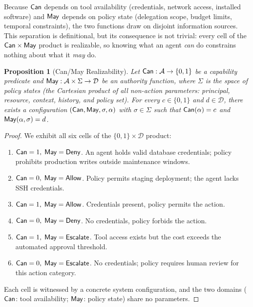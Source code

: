 \documentclass[11pt,a4paper]{article}
\newtheorem{proposition}[definition]{Proposition}
\newcommand{\termlabel}[1]{\ifmmode\mathsf{#1}\else{\normalfont\textsc{\MakeLowercase{#1}}}\fi}
\newcommand{\May}{\termlabel{May}}
\newcommand{\Can}{\termlabel{Can}}
\newcommand{\Allow}{\termlabel{Allow}}
\newcommand{\Deny}{\termlabel{Deny}}
\newcommand{\Escalate}{\termlabel{Escalate}}
\begin{document}
Because $\Can$ depends on tool availability (credentials, network access, installed software) and $\May$ depends on policy state (delegation scope, budget limits, temporal constraints), the two functions draw on disjoint information sources.  This separation is definitional, but its consequence is not trivial: every cell of the $\Can \times \May$ product is realizable, so knowing what an agent \emph{can} do constrains nothing about what it \emph{may} do.

\begin{proposition}[Can/May Realizability]
\label{thm:canmay}
Let $\Can: \mathcal{A} \to \{0, 1\}$ be a capability predicate and $\May: \mathcal{A} \times \Sigma \to \mathcal{D}$ be an authority function, where $\Sigma$ is the space of policy states (the Cartesian product of all non-action parameters: principal, resource, context, history, and policy set). For every $c \in \{0,1\}$ and $d \in \mathcal{D}$, there exists a configuration $(\Can, \May, \sigma, \alpha)$ with $\sigma \in \Sigma$ such that $\Can(\alpha) = c$ and $\May(\alpha, \sigma) = d$.
\end{proposition}

\begin{proof}
We exhibit all six cells of the $\{0,1\} \times \mathcal{D}$ product:

\begin{enumerate}[label=(\roman*), leftmargin=2em, itemsep=1pt]
  \item $\Can = 1,\; \May = \Deny$. An agent holds valid database credentials; policy prohibits production writes outside maintenance windows.
  \item $\Can = 0,\; \May = \Allow$. Policy permits staging deployment; the agent lacks SSH credentials.
  \item $\Can = 1,\; \May = \Allow$. Credentials present, policy permits the action.
  \item $\Can = 0,\; \May = \Deny$. No credentials, policy forbids the action.
  \item $\Can = 1,\; \May = \Escalate$. Tool access exists but the cost exceeds the automated approval threshold.
  \item $\Can = 0,\; \May = \Escalate$. No credentials; policy requires human review for this action category.
\end{enumerate}

\noindent Each cell is witnessed by a concrete system configuration, and the two domains ($\Can$: tool availability; $\May$: policy state) share no parameters.
\end{proof}
\end{document}
